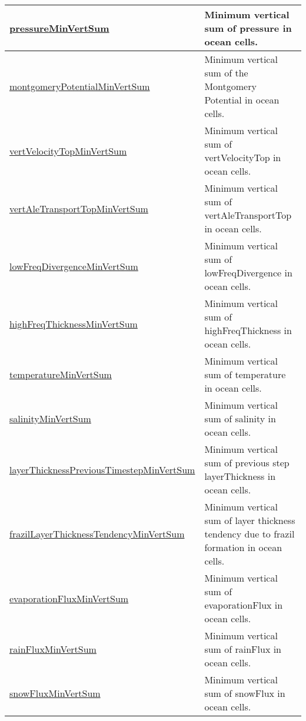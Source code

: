 {\begin{center}
\begin{longtable}{| p{2.0in} | p{4.0in} |}
    \hline
    \hyperref[subsec:var_sec_globalStatsAM_pressureMinVertSum]{pressureMinVertSum} & Minimum vertical sum of pressure in ocean cells. \\
    \hline
    \hyperref[subsec:var_sec_globalStatsAM_montgomeryPotentialMinVertSum]{montgomeryPotentialMinVert\-Sum} & Minimum vertical sum of the Montgomery Potential in ocean cells. \\
    \hline
    \hyperref[subsec:var_sec_globalStatsAM_vertVelocityTopMinVertSum]{vertVelocityTopMinVertSum} & Minimum vertical sum of vertVelocityTop in ocean cells. \\
    \hline
    \hyperref[subsec:var_sec_globalStatsAM_vertAleTransportTopMinVertSum]{vertAleTransportTopMinVert\-Sum} & Minimum vertical sum of vertAleTransportTop in ocean cells. \\
    \hline
    \hyperref[subsec:var_sec_globalStatsAM_lowFreqDivergenceMinVertSum]{lowFreqDivergenceMinVertSum} & Minimum vertical sum of lowFreqDivergence in ocean cells. \\
    \hline
    \hyperref[subsec:var_sec_globalStatsAM_highFreqThicknessMinVertSum]{highFreqThicknessMinVertSum} & Minimum vertical sum of highFreqThickness in ocean cells. \\
    \hline
    \hyperref[subsec:var_sec_globalStatsAM_temperatureMinVertSum]{temperatureMinVertSum} & Minimum vertical sum of temperature in ocean cells. \\
    \hline
    \hyperref[subsec:var_sec_globalStatsAM_salinityMinVertSum]{salinityMinVertSum} & Minimum vertical sum of salinity in ocean cells. \\
    \hline
    \hyperref[subsec:var_sec_globalStatsAM_layerThicknessPreviousTimestepMinVertSum]{layerThicknessPreviousTimestep\-MinVertSum} & Minimum vertical sum of previous step layerThickness in ocean cells. \\
    \hline
    \hyperref[subsec:var_sec_globalStatsAM_frazilLayerThicknessTendencyMinVertSum]{frazilLayerThicknessTendencyMin\-VertSum} & Minimum vertical sum of layer thickness tendency due to frazil formation in ocean cells. \\
    \hline
    \hyperref[subsec:var_sec_globalStatsAM_evaporationFluxMinVertSum]{evaporationFluxMinVertSum} & Minimum vertical sum of evaporationFlux in ocean cells. \\
    \hline
    \hyperref[subsec:var_sec_globalStatsAM_rainFluxMinVertSum]{rainFluxMinVertSum} & Minimum vertical sum of rainFlux in ocean cells. \\
    \hline
    \hyperref[subsec:var_sec_globalStatsAM_snowFluxMinVertSum]{snowFluxMinVertSum} & Minimum vertical sum of snowFlux in ocean cells. \\

\end{longtable}
\end{center}}
